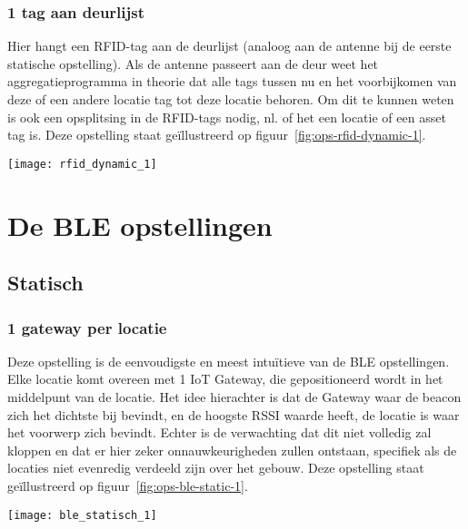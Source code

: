 \subsubsection{1 tag aan deurlijst}
\begin{minipage}{0.65\textwidth}
Hier hangt een RFID-tag aan de deurlijst (analoog aan de antenne bij de eerste statische opstelling). Als de antenne passeert aan de deur weet het aggregatieprogramma in theorie dat alle tags tussen nu en het voorbijkomen van deze of een andere locatie tag tot deze locatie behoren. Om dit te kunnen weten is ook een opsplitsing in de RFID-tags nodig, nl. of het een locatie of een asset tag is. Deze opstelling staat geïllustreerd op figuur~\ref{fig:ops-rfid-dynamic-1}.
\end{minipage}
\hfill
\begin{minipage}{0.30\textwidth}
	\texttt{[image: rfid\_dynamic\_1]}
	\label{fig:ops-rfid-dynamic-1}
\end{minipage}

\section[BLE]{De BLE opstellingen}
\label{sec:ops-ble}

\subsection{Statisch}
\subsubsection{1 gateway per locatie}
\begin{minipage}{0.65\textwidth}
Deze opstelling is de eenvoudigste en meest intuïtieve van de BLE opstellingen. Elke locatie komt overeen met 1 IoT Gateway, die gepositioneerd wordt in het middelpunt van de locatie. Het idee hierachter is dat de Gateway waar de beacon zich het dichtste bij bevindt, en de hoogste RSSI waarde heeft, de locatie is waar het voorwerp zich bevindt. Echter is de verwachting dat dit niet volledig zal kloppen en dat er hier zeker onnauwkeurigheden zullen ontstaan, specifiek als de locaties niet evenredig verdeeld zijn over het gebouw. Deze opstelling staat geïllustreerd op figuur~\ref{fig:ops-ble-static-1}.
\end{minipage}
\hfill
\begin{minipage}{0.30\textwidth}
	\texttt{[image: ble\_statisch\_1]}
	\label{fig:ops-ble-static-1}
\end{minipage}

